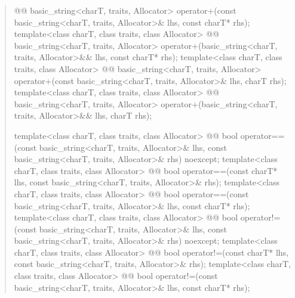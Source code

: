 \documentclass{wg21}
\begin{document}
\begin{quote}
\begin{codeblock}
{    @@ basic_string<charT, traits, Allocator>
      operator+(const basic_string<charT, traits, Allocator>& lhs,
                const charT* rhs);
  template<class charT, class traits, class Allocator>
    @@ basic_string<charT, traits, Allocator>
      operator+(basic_string<charT, traits, Allocator>&& lhs,
                const charT* rhs);
  template<class charT, class traits, class Allocator>
    @@ basic_string<charT, traits, Allocator>
      operator+(const basic_string<charT, traits, Allocator>& lhs,
                charT rhs);
  template<class charT, class traits, class Allocator>
    @@ basic_string<charT, traits, Allocator>
      operator+(basic_string<charT, traits, Allocator>&& lhs,
                charT rhs);

  template<class charT, class traits, class Allocator>
    @@
    bool operator==(const basic_string<charT, traits, Allocator>& lhs,
                    const basic_string<charT, traits, Allocator>& rhs) noexcept;
  template<class charT, class traits, class Allocator>
    @@
    bool operator==(const charT* lhs,
                    const basic_string<charT, traits, Allocator>& rhs);
  template<class charT, class traits, class Allocator>
    @@
    bool operator==(const basic_string<charT, traits, Allocator>& lhs,
                    const charT* rhs);
  template<class charT, class traits, class Allocator>
    @@
    bool operator!=(const basic_string<charT, traits, Allocator>& lhs,
                    const basic_string<charT, traits, Allocator>& rhs) noexcept;
  template<class charT, class traits, class Allocator>
    @@
    bool operator!=(const charT* lhs,
                    const basic_string<charT, traits, Allocator>& rhs);
  template<class charT, class traits, class Allocator>
    @@
    bool operator!=(const basic_string<charT, traits, Allocator>& lhs,
                    const charT* rhs);

}
\end{codeblock}
\end{quote}
\end{document}
